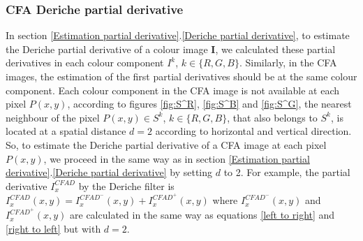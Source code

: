 \documentclass[twoside]{article}
\newcommand\D{I^{CFAD}} %
\newcommand\Dplus{I^{CFAD^+}}
\newcommand\Dmoins{I^{CFAD^-}}
\begin{document}
%
%
%
%	
%	
%
%

\subsubsection{CFA Deriche partial derivative}
In section \ref{Estimation partial derivative}.\ref{Deriche partial derivative}, to estimate the Deriche partial derivative of a colour image $\textbf{I}$, we calculated these partial derivatives in each colour component $I^k$, $k\in\{R,G,B\}$.   
Similarly, in the CFA images, the estimation of the first partial derivatives should be at the same colour component. Each colour component in the CFA image is not available at each pixel $P(x,y)$, according to figures \ref{fig:S^R}, \ref{fig:S^B} and \ref{fig:S^G}, 
the nearest neighbour of the pixel $P(x,y)\in S^k$, $k\in\{R,G,B\}$, that also belongs to $S^k$, is located at a spatial distance $d=2$ according to horizontal and vertical direction. So, to estimate the Deriche partial derivative of a CFA image at each pixel $P(x,y)$, we proceed in the same way as in section \ref{Estimation partial derivative}.\ref{Deriche partial derivative} by setting $d$ to 2. For example, the partial derivative $\D_x$  by the Deriche filter is $\D_x(x,y)=\Dmoins_x(x,y) + \Dplus_x(x,y)$ where $\Dmoins_x(x,y)$ and $\Dplus_x(x,y)$ are calculated in the same way as equations \eqref{left to right}  and \eqref{right to left} but with $d=2$.
\end{document}
